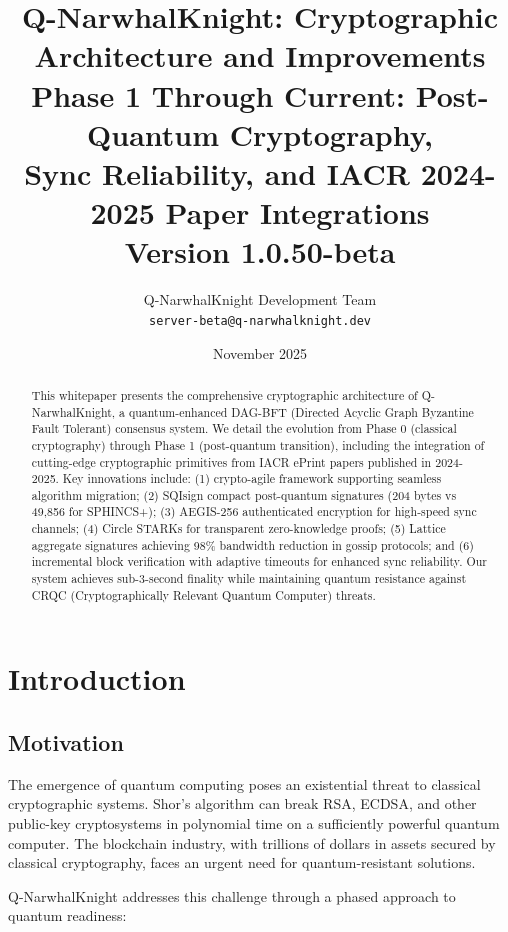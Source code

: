 \documentclass[11pt,a4paper]{article}
\title{
    \vspace{-2cm}
    \textbf{Q-NarwhalKnight: Cryptographic Architecture and Improvements}\\[0.5cm]
    \large Phase 1 Through Current: Post-Quantum Cryptography, \\
    Sync Reliability, and IACR 2024-2025 Paper Integrations\\[0.3cm]
    \normalsize Version 1.0.50-beta
}
\author{
    Q-NarwhalKnight Development Team\\
    \texttt{server-beta@q-narwhalknight.dev}
}
\date{November 2025}
\begin{document}
\maketitle

\begin{abstract}
This whitepaper presents the comprehensive cryptographic architecture of Q-NarwhalKnight, a quantum-enhanced DAG-BFT (Directed Acyclic Graph Byzantine Fault Tolerant) consensus system. We detail the evolution from Phase 0 (classical cryptography) through Phase 1 (post-quantum transition), including the integration of cutting-edge cryptographic primitives from IACR ePrint papers published in 2024-2025. Key innovations include: (1) crypto-agile framework supporting seamless algorithm migration; (2) SQIsign compact post-quantum signatures (204 bytes vs 49,856 for SPHINCS+); (3) AEGIS-256 authenticated encryption for high-speed sync channels; (4) Circle STARKs for transparent zero-knowledge proofs; (5) Lattice aggregate signatures achieving 98\% bandwidth reduction in gossip protocols; and (6) incremental block verification with adaptive timeouts for enhanced sync reliability. Our system achieves sub-3-second finality while maintaining quantum resistance against CRQC (Cryptographically Relevant Quantum Computer) threats.
\end{abstract}

\tableofcontents
\newpage

\section{Introduction}

\subsection{Motivation}

The emergence of quantum computing poses an existential threat to classical cryptographic systems. Shor's algorithm can break RSA, ECDSA, and other public-key cryptosystems in polynomial time on a sufficiently powerful quantum computer. The blockchain industry, with trillions of dollars in assets secured by classical cryptography, faces an urgent need for quantum-resistant solutions.

Q-NarwhalKnight addresses this challenge through a phased approach to quantum readiness:
\end{document}
